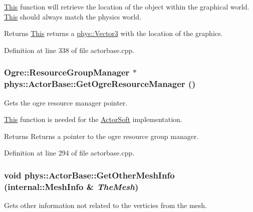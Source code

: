 \hyperlink{structThis}{This} function will retrieve the location of the object within the graphical world. \hyperlink{structThis}{This} should always match the physics world. \begin{DoxyReturn}{Returns}
\hyperlink{structThis}{This} returns a \hyperlink{classphys_1_1Vector3}{phys::Vector3} with the location of the graphics. 
\end{DoxyReturn}


Definition at line 338 of file actorbase.cpp.

\hypertarget{classphys_1_1ActorBase_afa9b5a1f149182a96a7608f52847b7ed}{
\subsubsection[{GetOgreResourceManager}]{\setlength{\rightskip}{0pt plus 5cm}Ogre::ResourceGroupManager $\ast$ phys::ActorBase::GetOgreResourceManager ()}}
\label{d8/d0f/classphys_1_1ActorBase_afa9b5a1f149182a96a7608f52847b7ed}


Gets the ogre resource manager pointer. 

\hyperlink{structThis}{This} function is needed for the \hyperlink{classphys_1_1ActorSoft}{ActorSoft} implementation. \begin{DoxyReturn}{Returns}
Returns a pointer to the ogre resource group manager. 
\end{DoxyReturn}


Definition at line 294 of file actorbase.cpp.

\hypertarget{classphys_1_1ActorBase_a1ca4a67351c3d7375a62223d12729776}{
\subsubsection[{GetOtherMeshInfo}]{\setlength{\rightskip}{0pt plus 5cm}void phys::ActorBase::GetOtherMeshInfo ({\bf internal::MeshInfo} \& {\em TheMesh})}}
\label{d8/d0f/classphys_1_1ActorBase_a1ca4a67351c3d7375a62223d12729776}


Gets other information not related to the verticies from the mesh. 

